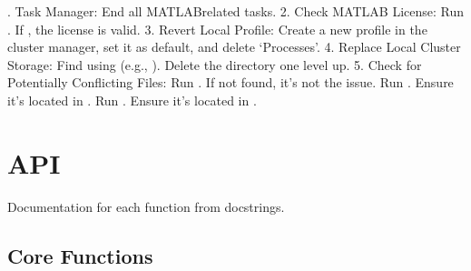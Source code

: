 \documentclass[letterpaper,10pt,english]{sphinxmanual}
\begin{document}
. Task Manager:
\sphinxhyphen{} End all MATLAB\sphinxhyphen{}related tasks.
2. Check MATLAB License:
\sphinxhyphen{} Run .
\sphinxhyphen{} If , the license is valid.
3. Revert Local Profile:
\sphinxhyphen{} Create a new profile in the cluster manager, set it as default, and delete ‘Processes’.
4. Replace Local Cluster Storage:
\sphinxhyphen{} Find  using  (e.g., ).
\sphinxhyphen{} Delete the  directory one level up.
5. Check for Potentially Conflicting Files:
\sphinxhyphen{} Run . If not found, it’s not the issue.
\sphinxhyphen{} Run . Ensure it’s located in .
\sphinxhyphen{} Run . Ensure it’s located in .
\begin{quote}
\end{quote}

\sphinxstepscope


\section{API}
\label{\detokenize{api/index:api}}\label{\detokenize{api/index::doc}}
\sphinxAtStartPar
Documentation for each function from docstrings.

\sphinxstepscope


\subsection{Core Functions}
\label{\detokenize{api/core:core-functions}}\label{\detokenize{api/core::doc}}

\begin{fulllineitems}
\label{\detokenize{api/core:assembleCorrectedROITiff}}
\pysigstartsignatures
{}
\pysigstopsignatures
\end{fulllineitems}
\end{document}
